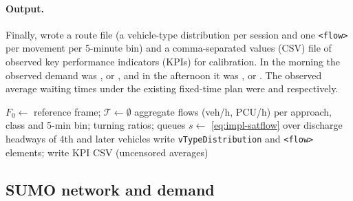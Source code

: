 \paragraph{Output.} Finally, \dtx{} wrote a \sumo{} route file (a vehicle-type distribution per session
and one \texttt{<flow>} per movement per 5-minute bin) and a comma-separated values (CSV) file of
observed key performance indicators (KPIs) for calibration. In the morning the observed demand
was , or , and in the afternoon it was , or
. The observed average waiting times under the existing fixed-time plan were
 and  respectively.

\begin{algorithm}[htbp]
\DontPrintSemicolon
{}
$F_0 \gets$ reference frame; $\mathcal{T} \gets \emptyset$\;
aggregate flows (veh/h, PCU/h) per approach, class and 5-min bin; turning ratios; queues\;
$s \gets$ \cref{eq:impl-satflow} over discharge headways of 4th and later vehicles\;
write \texttt{vTypeDistribution} and \texttt{<flow>} elements; write KPI CSV (uncensored averages)\;
\caption{\dtx{} drone trajectory extraction}\label{alg:dtx}
\end{algorithm}

\subsection{SUMO network and demand}\label{sec:impl-sumo}

